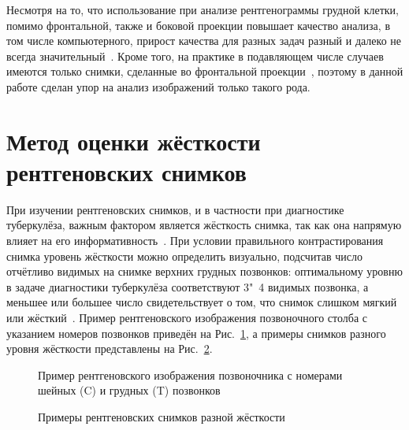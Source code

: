 Несмотря на то, что использование при анализе рентгенограммы грудной клетки, помимо фронтальной, также и боковой проекции повышает качество анализа, в том числе компьютерного, прирост качества для разных задач разный и далеко не всегда значительный~\cite{kluthke2016additional, hashir2020quantifying}. Кроме того, на практике в подавляющем числе случаев имеются только снимки, сделанные во фронтальной проекции~\cite{вишнякова2016частота}, поэтому в данной работе сделан упор на анализ изображений только такого рода.

\section{Метод оценки жёсткости рентгеновских снимков}

При изучении рентгеновских снимков, и в частности при диагностике туберкулёза, важным фактором является жёсткость снимка, так как она напрямую влияет на его информативность~\cite{chuiko1982effects, тимофеева2013основные}. При условии правильного контрастирования снимка уровень жёсткости можно определить визуально, подсчитав число отчётливо видимых на снимке верхних грудных позвонков: оптимальному уровню в задаче диагностики туберкулёза соответствуют 3"~4 видимых позвонка, а меньшее или большее число свидетельствует о том, что снимок слишком мягкий или жёсткий~\cite{тимофеева2013основные, сидоров2012методика}. Пример рентгеновского изображения позвоночного столба с указанием номеров позвонков приведён на Рис.~\ref{fig:vertebral-column}, а примеры снимков разного уровня жёсткости представлены на Рис.~\ref{fig:samples-different-hardness}.

\begin{figure}[ht]
	\caption{Пример рентгеновского изображения позвоночника с номерами шейных (C) и грудных (T) позвонков}
	\label{fig:vertebral-column}
\end{figure}

\begin{figure}[ht]
	\caption{Примеры рентгеновских снимков разной жёсткости}
	\label{fig:samples-different-hardness}
\end{figure}

